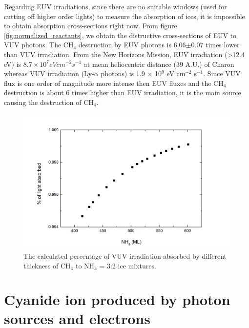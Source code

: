 Regarding EUV irradiations, since there are no suitable windows (used for cutting off higher order lights) to measure the absorption of ices, it is impossible to obtain absorption cross-sections right now. From figure \ref{fig:normalized_reactants}, we obtain the distructive cross-sections of EUV to VUV photons. The CH$_4$ destruction by EUV photons is 6.06$\pm$0.07 times lower than VUV irradiation.  From the New Horizons Mission, EUV irradiation (>12.4 eV) is $8.7 \times 10^7 eV cm^{-2} s^{-1}$ at mean heliocentric distance (39 A.U.) of Charon whereas VUV irradiation (Ly-$\alpha$ photons) is 1.9 $\times$ 10$^9$ eV cm$^{-2}$ s$^{-1}$\cite{grundy2016formation}. Since VUV flux is one order of magnitude more intense then EUV fluxes and the CH$_4$ destruction is about 6 times higher than EUV irradiation, it is the main source causing the destruction of CH$_4$.

\begin{figure}
\centering
\includegraphics[width=\textwidth]{figures/chapter4/absorption_percentage.png}
\caption{The calculated percentage of VUV irradiation absorbed by different thickness of CH$_4$ to NH$_3$ = 3:2 ice mixtures.}
\label{fig:absorption_percentage}
\end{figure}

\section{Cyanide ion produced by photon sources and electrons} %

